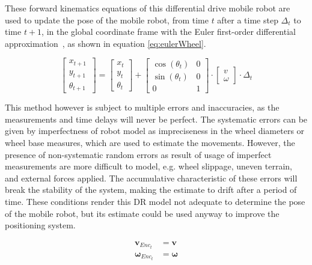 These forward kinematics equations of this differential drive mobile robot are used to update the pose of the mobile robot, from time $t$ after a time step $\Delta_t$ to time $t+1$, in the global coordinate frame with the Euler first-order differential approximation~\cite{braun_first-order_1993}, as shown in equation \ref{eq:eulerWheel}.

\begin{equation}
\begin{bmatrix} x_{t + 1} \\ y_{t + 1} \\ \theta _{t + 1} ~ \end{bmatrix}
= 
\begin{bmatrix} {x_t} \\ {y_t} \\ {\theta _t}  \end{bmatrix} 
+ 
\begin{bmatrix}  \cos (\theta _t ) & 0\\  \sin (\theta _t ) & 0 \\ 0 & 1 \end{bmatrix}
\cdot 
\begin{bmatrix} v \\ \omega \end{bmatrix} \cdot
\Delta_t
\label{eq:eulerWheel}
\end{equation}


This method however is subject to multiple errors and inaccuracies, as the measurements and time delays will never be perfect. 
The systematic errors can be given by imperfectness of robot model as impreciseness in the wheel diameters or wheel base measures, which are used to estimate the movements. 
However, the presence of non-systematic random errors as result of usage of imperfect measurements are more difficult to model, e.g. wheel slippage, uneven terrain, and external forces applied.
The accumulative characteristic of these errors will break the stability of the system, making the estimate to drift after a period of time.
These conditions render this \gls{DR} model not adequate to determine the pose of the mobile robot, but its estimate could be used anyway to improve the positioning system. 




\begin{align}
\mathbf{v}_{Enc_t} & = \mathbf{v}\\
\boldsymbol \omega_{Enc_t} & = \boldsymbol \omega
\end{align}



